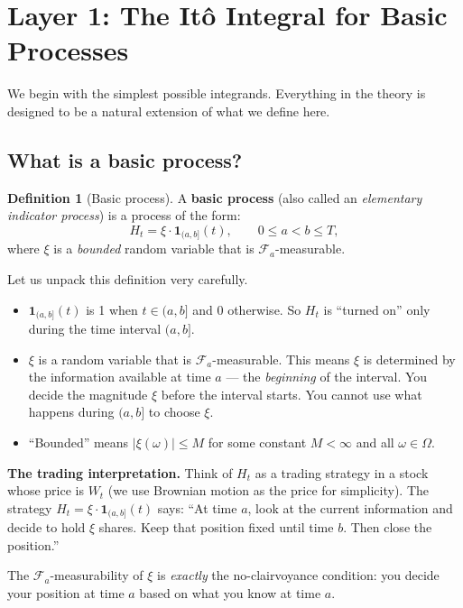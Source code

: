 \documentclass[11pt,a4paper]{article}
\theoremstyle{definition}
\newtheorem{definition}{Definition}[section]
\theoremstyle{plain}
\theoremstyle{remark}
\newcommand{\F}{\mathcal{F}}
\newcommand{\abs}[1]{\left|#1\right|}
\begin{document}
\section{Layer 1: The Itô Integral for Basic Processes}
\label{sec:basic}

We begin with the simplest possible integrands. Everything in the theory is designed to be a natural extension of what we define here.

\subsection{What is a basic process?}

\begin{definition}[Basic process]
\label{def:basic}
A \textbf{basic process} (also called an \emph{elementary indicator process}) is a process of the form:
\[
  H_t = \xi \cdot \mathbf{1}_{(a,b]}(t), \qquad 0 \leq a < b \leq T,
\]
where $\xi$ is a \emph{bounded} random variable that is $\F_a$-measurable.
\end{definition}

Let us unpack this definition very carefully.

\begin{itemize}
  \item $\mathbf{1}_{(a,b]}(t)$ is 1 when $t \in (a,b]$ and 0 otherwise. So $H_t$ is ``turned on'' only during the time interval $(a,b]$.
  \item $\xi$ is a random variable that is $\F_a$-measurable. This means $\xi$ is determined by the information available at time $a$ — the \emph{beginning} of the interval. You decide the magnitude $\xi$ before the interval starts. You cannot use what happens during $(a,b]$ to choose $\xi$.
  \item ``Bounded'' means $\abs{\xi(\omega)} \leq M$ for some constant $M < \infty$ and all $\omega \in \Omega$.
\end{itemize}

\begin{tutobox}
\textbf{The trading interpretation.}
Think of $H_t$ as a trading strategy in a stock whose price is $W_t$ (we use Brownian motion as the price for simplicity). The strategy $H_t = \xi \cdot \mathbf{1}_{(a,b]}(t)$ says: ``At time $a$, look at the current information and decide to hold $\xi$ shares. Keep that position fixed until time $b$. Then close the position.''

The $\F_a$-measurability of $\xi$ is \emph{exactly} the no-clairvoyance condition: you decide your position at time $a$ based on what you know at time $a$.
\end{tutobox}
\end{document}
